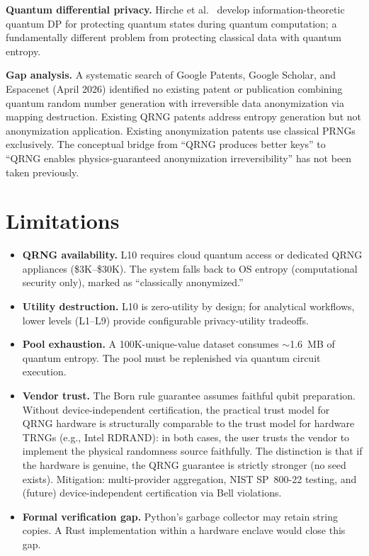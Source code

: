 \documentclass[acmsmall,screen,review,anonymous]{acmart}
\begin{document}
\textbf{Quantum differential privacy.} Hirche et al.~\cite{hirche2022qdp} develop information-theoretic quantum DP for protecting quantum states during quantum computation; a fundamentally different problem from protecting classical data with quantum entropy.

\textbf{Gap analysis.} A systematic search of Google Patents, Google Scholar, and Espacenet (April 2026) identified no existing patent or publication combining quantum random number generation with irreversible data anonymization via mapping destruction. Existing QRNG patents address entropy generation but not anonymization application. Existing anonymization patents use classical PRNGs exclusively. The conceptual bridge from ``QRNG produces better keys'' to ``QRNG enables physics-guaranteed anonymization irreversibility'' has not been taken previously.

\section{Limitations}
\label{sec:limitations}

\begin{itemize}
\item \textbf{QRNG availability.} L10 requires cloud quantum access or dedicated QRNG appliances (\$3K--\$30K). The system falls back to OS entropy (computational security only), marked as ``classically anonymized.''

\item \textbf{Utility destruction.} L10 is zero-utility by design; for analytical workflows, lower levels (L1--L9) provide configurable privacy-utility tradeoffs.

\item \textbf{Pool exhaustion.} A 100K-unique-value dataset consumes ${\sim}$1.6~MB of quantum entropy. The pool must be replenished via quantum circuit execution.

\item \textbf{Vendor trust.} The Born rule guarantee assumes faithful qubit preparation. Without device-independent certification, the practical trust model for QRNG hardware is structurally comparable to the trust model for hardware TRNGs (e.g., Intel RDRAND): in both cases, the user trusts the vendor to implement the physical randomness source faithfully. The distinction is that if the hardware is genuine, the QRNG guarantee is strictly stronger (no seed exists). Mitigation: multi-provider aggregation, NIST SP~800-22 testing, and (future) device-independent certification via Bell violations.

\item \textbf{Formal verification gap.} Python's garbage collector may retain string copies. A Rust implementation within a hardware enclave would close this gap.
\end{itemize}
\end{document}
